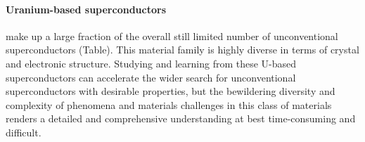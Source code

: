 

\paragraph{Uranium-based superconductors} make up a large fraction of the overall still limited number of unconventional superconductors (Table). This material family is highly diverse in terms of crystal and electronic structure. %
Studying and learning from these U-based superconductors can accelerate the wider search for unconventional superconductors with desirable properties, but the bewildering diversity and complexity of phenomena and materials challenges in this class of materials renders a detailed and comprehensive understanding at best time-consuming and difficult. 

